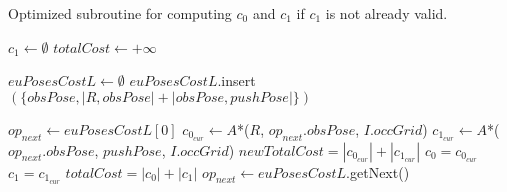 \begin{algorithm}[H]

  \caption{Optimized subroutine for computing $c_{0}$ and $c_{1}$ if $c_{1}$ is not already valid.}

  \label{alg:04-custom-observation-optimized-compute01c1}

  \begin{algorithmic}[1]

      \State $c_{1} \gets \emptyset$
      \State $totalCost \gets +\infty$


      \State $euPosesCostL \gets \emptyset$ 
        \State $euPosesCostL$.insert$(\{obsPose, |{R, obsPose}| + |{obsPose, pushPose}|\})$
      \EndFor

        \State $op_{next} \gets euPosesCostL[0]$
          \State $c_{0_{cur}} \gets A$*($R$, $op_{next}.obsPose$, $I.occGrid$)
          \State $c_{1_{cur}} \gets A$*($op_{next}.obsPose$, $pushPose$, $I.occGrid$)
          \State $newTotalCost = |c_{0_{cur}}| + |c_{1_{cur}}|$
            \State $c_{0} = c_{0_{cur}}$
            \State $c_{1} = c_{1_{cur}}$
            \State $totalCost = |c_{0}| + |c_{1}|$
          \EndIf
          \State $op_{next} \gets euPosesCostL$.getNext()
        \EndWhile
      \EndIf
    \EndProcedure

  \end{algorithmic}
\end{algorithm}
